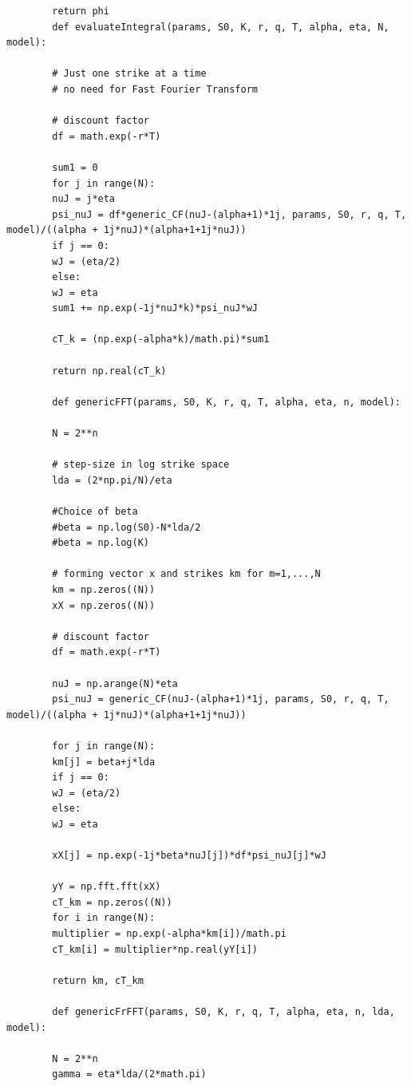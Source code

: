 \documentclass[letterpaper]{article}
\begin{document}
\begin{lstlisting}
       	return phi
       	def evaluateIntegral(params, S0, K, r, q, T, alpha, eta, N, model):
       	
       	# Just one strike at a time
       	# no need for Fast Fourier Transform
       	
       	# discount factor
       	df = math.exp(-r*T)
       	
       	sum1 = 0
       	for j in range(N):
       	nuJ = j*eta
       	psi_nuJ = df*generic_CF(nuJ-(alpha+1)*1j, params, S0, r, q, T, model)/((alpha + 1j*nuJ)*(alpha+1+1j*nuJ))
       	if j == 0:
       	wJ = (eta/2)
       	else:
       	wJ = eta
       	sum1 += np.exp(-1j*nuJ*k)*psi_nuJ*wJ
       	
       	cT_k = (np.exp(-alpha*k)/math.pi)*sum1
       	
       	return np.real(cT_k) 
       	
       	def genericFFT(params, S0, K, r, q, T, alpha, eta, n, model):
       	
       	N = 2**n
       	
       	# step-size in log strike space
       	lda = (2*np.pi/N)/eta
       	
       	#Choice of beta
       	#beta = np.log(S0)-N*lda/2
       	#beta = np.log(K)
       	
       	# forming vector x and strikes km for m=1,...,N
       	km = np.zeros((N))
       	xX = np.zeros((N))
       	
       	# discount factor
       	df = math.exp(-r*T)
       	
       	nuJ = np.arange(N)*eta
       	psi_nuJ = generic_CF(nuJ-(alpha+1)*1j, params, S0, r, q, T, model)/((alpha + 1j*nuJ)*(alpha+1+1j*nuJ))
       	
       	for j in range(N):  
       	km[j] = beta+j*lda
       	if j == 0:
       	wJ = (eta/2)
       	else:
       	wJ = eta
       	
       	xX[j] = np.exp(-1j*beta*nuJ[j])*df*psi_nuJ[j]*wJ
       	
       	yY = np.fft.fft(xX)
       	cT_km = np.zeros((N))  
       	for i in range(N):
       	multiplier = np.exp(-alpha*km[i])/math.pi
       	cT_km[i] = multiplier*np.real(yY[i])
       	
       	return km, cT_km
       	
       	def genericFrFFT(params, S0, K, r, q, T, alpha, eta, n, lda, model):
       	
       	N = 2**n
       	gamma = eta*lda/(2*math.pi)
       	

\end{lstlisting}
\end{document}
